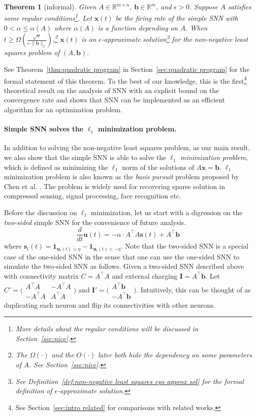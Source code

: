 \documentclass[11pt]{article}
\newtheorem{theorem}{Theorem}
\theoremstyle{remark}
\theoremstyle{definition}
\newcommand{\bx}{\mathbf{x}}
\newcommand{\bb}{\mathbf{b}}
\newcommand{\bI}{\mathbf{I}}
\newcommand{\bu}{\mathbf{u}}
\newcommand{\bs}{\mathbf{s}}
\newcommand{\R}{{\mathbb R}} %
\begin{document}
\begin{theorem}[informal]\label{thm:quadratic program informal}
	Given $A\in\R^{m\times n}$, $\bb\in\R^m$, and $\epsilon>0$. Suppose $A$ satisfies some regular conditions\footnote{More details about the regular conditions will be discussed in Section~\ref{sec:nice}.}. Let $\bx(t)$ be the firing rate of the simple SNN with $0<\alpha\leq\alpha(A)$ where $\alpha(A)$ is a function depending on $A$. When $t\geq\Omega(\frac{\sqrt{n}}{\epsilon\cdot\|\bb\|_2})$,\footnote{The $\Omega(\cdot)$ and the $O(\cdot)$ later both hide the dependency on some parameters of $A$. See Section~\ref{sec:nice}.} $\bx(t)$ is an $\epsilon$-approximate solution\footnote{See Definition~\ref{def:non-negative least squares eps approx sol} for the formal definition of $\epsilon$-approximate solution.} for the non-negative least squares problem of $(A,\bb)$.
\end{theorem}

See Theorem~\ref{thm:quadratic program} in Section~\ref{sec:quadratic program} for the formal statement of this theorem. To the best of our knowledge, this is the first\footnote{See Section~\ref{sec:intro related} for comparisons with related works.} theoretical result on the analysis of SNN with an explicit bound on the convergence rate and shows that SNN can be implemented as an efficient algorithm for an optimization problem. 

\paragraph{Simple SNN solves the $\ell_1$ minimization problem.} 
In addition to solving the non-negative least squares problem, as our main result, we also show that the simple SNN is able to solve the \textit{$\ell_1$ minimization problem}, which is defined as minimizing the $\ell_1$ norm of the solutions of $A\bx=\bb$.
%
$\ell_1$ minimization problem is also known as the {\it basis pursuit} problem proposed by Chen et al. \cite{chen2001atomic}. The problem is widely used for recovering sparse solution in compressed sensing, signal processing, face recognition etc. 

Before the discussion on $\ell_1$ minimization, let us start with a digression on the \textit{two-sided} simple SNN for the convenience of future analysis.
$$
\frac{d}{dt}\bu(t) = -\alpha\cdot A^\top A\bs(t) +A^\top\bb
$$
where $\bs_i(t)=\mathbf{1}_{\bu_i(t)>\eta}-\mathbf{1}_{\bu_i(t)<-\eta}$.
Note that the two-sided SNN is a special case of the one-sided SNN in the sense that one can use the one-sided SNN to simulate the two-sided SNN as follows. Given a two-sided SNN described above with connectivity matrix $C=A^\top A$ and external charging $\bI=A^\top\bb$. Let $C'=\bigl( \begin{smallmatrix}A^\top A & -A^\top A \\ -A^\top A & A^\top A\end{smallmatrix}\bigr)$ and $\bI'=\bigl( \begin{smallmatrix} A^\top\bb \\ -A^\top\bb\end{smallmatrix}\bigr)$. Intuitively, this can be thought of as duplicating each neuron and flip its connectivities with other neurons.
\end{document}
